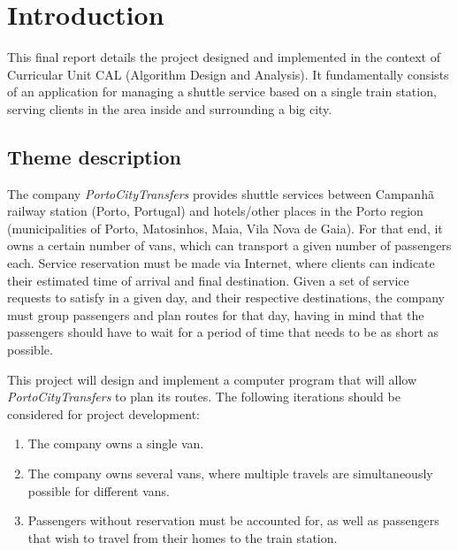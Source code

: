 \chapter{Introduction} \label{introduction}
This final report details the project designed and implemented in the context of Curricular Unit CAL (Algorithm Design and Analysis).
It fundamentally consists of an application for managing a shuttle service based on a single train station, serving clients in the area inside and surrounding a big city.
\section{Theme description}
The company \emph{PortoCityTransfers} provides shuttle services between Campanhã railway station (Porto, Portugal) and hotels/other places in the Porto region (municipalities of Porto, Matosinhos, Maia, Vila Nova de Gaia). For that end, it owns a certain number of vans, which can transport a given number of passengers each. Service reservation must be made via Internet, where clients can indicate their estimated time of arrival and final destination. Given a set of service requests to satisfy in a given day, and their respective destinations, the company must group passengers and plan routes for that day, having in mind that the passengers should have to wait for a period of time that needs to be as short as possible.\par
This project will design and implement a computer program that will allow \emph{PortoCityTransfers} to plan its routes. The following iterations should be considered for project development:
\begin{enumerate}
    \item The company owns a single van.
    \item The company owns several vans, where multiple travels are simultaneously possible for different vans.
    \item Passengers without reservation must be accounted for, as well as passengers that wish to travel from their homes to the train station.
\end{enumerate}
